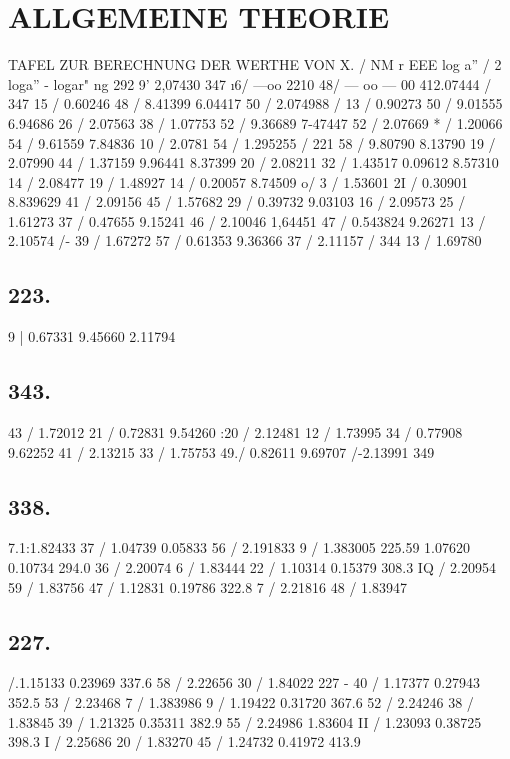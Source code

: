 \documentclass[12pt,a4paper]{article}
\begin{document}
\newpage


\section*{ALLGEMEINE THEORIE}
TAFEL ZUR BERECHNUNG DER WERTHE VON X. / NM \textdegree{} r EEE log a'' / 2 loga'' - logar" ng 292\textdegree{} 9' 2,07430 347\textdegree{} \i{}6/ ---oo 2210 48\textdegree{}/ --- oo --- 00 412.07444 / 347 15 / 0.60246 48 / 8.41399 6.04417 50 / 2.074988 / 13 / 0.90273 50 / 9.01555 6.94686 26 / 2.07563 38 / 1.07753 52 / 9.36689 7-47447 52 / 2.07669 * / 1.20066 54 / 9.61559 7.84836 10 / 2.0781 54 / 1.295255 / 221 58 / 9.80790 8.13790 19 / 2.07990 44 / 1.37159 9.96441 8.37399 20 / 2.08211 32 / 1.43517 0.09612 8.57310 14 / 2.08477 19 / 1.48927 14 / 0.20057 8.74509 o/ 3 / 1.53601 2I / 0.30901 8.839629 41 / 2.09156 45 / 1.57682 29 / 0.39732 9.03103 16 / 2.09573 25 / 1.61273 37 / 0.47655 9.15241 46 / 2.10046 1,64451 47 / 0.543824 9.26271 13 / 2.10574 /- 39 / 1.67272 57 / 0.61353 9.36366 37 / 2.11157 / 344 13 / 1.69780

\subsection*{223.}
9 | 0.67331 9.45660 2.11794

\subsection*{343.}
43 / 1.72012 21 / 0.72831 9.54260 :20 / 2.12481 12 / 1.73995 34 / 0.77908 9.62252 41 / 2.13215 33 / 1.75753 49./ 0.82611 9.69707 /-2.13991 349%

\subsection*{338.}
7.1:1.82433 37 / 1.04739 0.05833 56 / 2.191833 9 / 1.383005 225.59 1.07620 0.10734 294.0 36 / 2.20074 6 / 1.83444 22 / 1.10314 0.15379 308.3 IQ / 2.20954 59 / 1.83756 47 / 1.12831 0.19786 322.8 7 / 2.21816 48 / 1.83947

\subsection*{227.}
/.1.15133 0.23969 337.6 58 / 2.22656 30 / 1.84022 227 - 40 / 1.17377 0.27943 352.5 53 / 2.23468 7 / 1.383986 9 / 1.19422 0.31720 367.6 52 / 2.24246 38 / 1.83845 39 / 1.21325 0.35311 382.9 55 / 2.24986 1.83604 II / 1.23093 0.38725 398.3 I / 2.25686 20 / 1.83270 45 / 1.24732 0.41972 413.9
\end{document}
